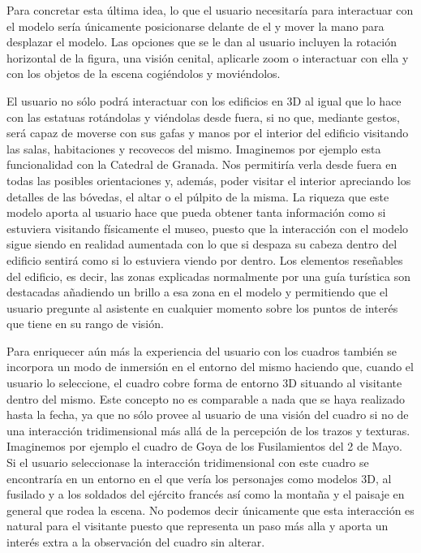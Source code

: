 \documentclass[a4paper,11pt]{article}
\begin{document}
\vspace{10px}

Para concretar esta última idea, lo que el usuario necesitaría para interactuar con el modelo sería únicamente posicionarse delante de el y mover la mano para desplazar el modelo. Las opciones que se le dan al usuario incluyen la rotación horizontal de la figura, una visión cenital, aplicarle zoom o interactuar con ella y con los objetos de la escena cogiéndolos y moviéndolos.

\vspace{10px}

El usuario no sólo podrá interactuar con los edificios en 3D al igual que lo hace con las estatuas rotándolas y viéndolas desde fuera, si no que, mediante gestos, será capaz de moverse con sus gafas y manos por el interior del edificio visitando las salas, habitaciones y recovecos del mismo. Imaginemos por ejemplo esta funcionalidad con la Catedral de Granada. Nos permitiría verla desde fuera en todas las posibles orientaciones y, además, poder visitar el interior apreciando los detalles de las bóvedas, el altar o el púlpito de la misma. La riqueza que este modelo aporta al usuario hace que pueda obtener tanta información como si estuviera visitando físicamente el museo, puesto que la interacción con el modelo sigue siendo en realidad aumentada con lo que si despaza su cabeza dentro del edificio sentirá como si lo estuviera viendo por dentro. Los elementos reseñables del edificio, es decir, las zonas explicadas normalmente por una guía turística son destacadas añadiendo un brillo a esa zona en el modelo y permitiendo que el usuario pregunte al asistente en cualquier momento sobre los puntos de interés que tiene en su rango de visión.

\vspace{10px}

Para enriquecer aún más la experiencia del usuario con los cuadros también se incorpora un modo de inmersión en el entorno del mismo haciendo que, cuando el usuario lo seleccione, el cuadro cobre forma de entorno 3D situando al visitante dentro del mismo. Este concepto no es comparable a nada que se haya realizado hasta la fecha, ya que no sólo provee al usuario de una visión del cuadro si no de una interacción tridimensional más allá de la percepción de los trazos y texturas. Imaginemos por ejemplo el cuadro de Goya de los Fusilamientos del 2 de Mayo. Si el usuario seleccionase la interacción tridimensional con este cuadro se encontraría en un entorno en el que vería los personajes como modelos 3D, al fusilado y a los soldados del ejército francés así como la montaña y el paisaje en general que rodea la escena. No podemos decir únicamente que esta interacción es natural para el visitante puesto que representa un paso más alla y aporta un interés extra a la observación del cuadro sin alterar.
\end{document}
